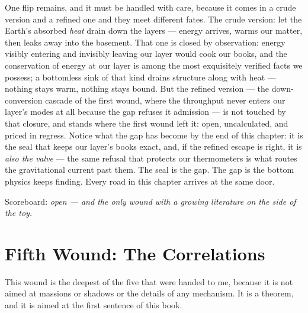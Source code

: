 \documentclass[fontsize=11pt,paper=a4,pagesize=auto,parskip=half-]{scrbook}
\begin{document}
One flip remains, and it must be handled with care, because it comes in a crude version and a refined one and they meet different fates. The crude version: let the Earth's absorbed \emph{heat} drain down the layers --- energy arrives, warms our matter, then leaks away into the basement. That one is closed by observation: energy visibly entering and invisibly leaving our layer would cook our books, and the conservation of energy at our layer is among the most exquisitely verified facts we possess; a bottomless sink of that kind drains structure along with heat --- nothing stays warm, nothing stays bound. But the refined version --- the down-conversion cascade of the first wound, where the throughput never enters our layer's modes at all because the gap refuses it admission --- is not touched by that closure, and stands where the first wound left it: open, uncalculated, and priced in regress. Notice what the gap has become by the end of this chapter: it is the seal that keeps our layer's books exact, and, if the refined escape is right, it is \emph{also the valve} --- the same refusal that protects our thermometers is what routes the gravitational current past them. The seal is the gap. The gap is the bottom physics keeps finding. Every road in this chapter arrives at the same door.

Scoreboard: \emph{open --- and the only wound with a growing literature on the side of the toy.}

\section{Fifth Wound: The Correlations}

This wound is the deepest of the five that were handed to me, because it is not aimed at massions or shadows or the details of any mechanism. It is a theorem, and it is aimed at the first sentence of this book.
\end{document}
